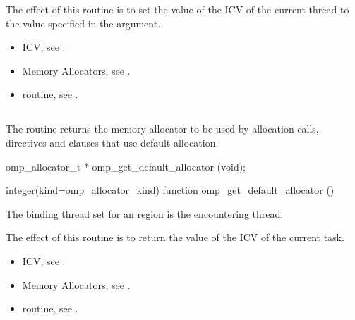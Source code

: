 \effect

The effect of this routine is to set the value of the  ICV of the current thread to the value specified in the  argument. 

\crossreferences

\begin{itemize}
\item {} ICV, see .
\item Memory Allocators, see .
\item {} routine, see .
\end{itemize}

\subsection{}
\label{subsec:omp_get_default_allocator}

\summary
The  routine returns the memory allocator to be used by allocation calls, directives and clauses that use default allocation.

\format
\ccppspecificstart
\begin{boxedcode}
omp_allocator_t * omp_get_default_allocator (void);
\end{boxedcode}
\ccppspecificend
\fortranspecificstart
\begin{boxedcode}
integer(kind=omp_allocator_kind) 
function omp_get_default_allocator ()
\end{boxedcode}
\fortranspecificend

\binding

The binding thread set for an  region is the encountering thread.

\effect

The effect of this routine is to return the value of the  ICV of the current task.

\crossreferences
\begin{itemize}
\item {} ICV, see .
\item Memory Allocators, see .
\item {} routine, see .
\end{itemize}

